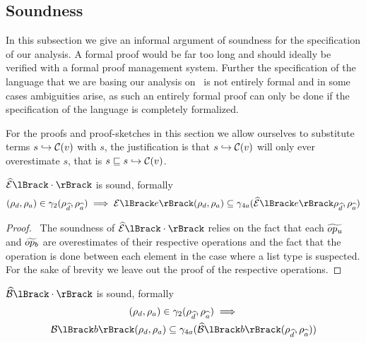 \subsection{Soundness}\label{subsec:soundness}

In this subsection we give an informal argument of soundness for the specification of our analysis.
A formal proof would be far too long and should ideally be verified with a formal proof management system.
Further the specification of the language that we are basing our analysis on~\cite{halder_abstract_2012} is not entirely formal and in some cases ambiguities arise, as such an entirely formal proof can only be done if the specification of the language is completely formalized.

For the proofs and proof-sketches in this section we allow ourselves to substitute terms $s \hookrightarrow \mathcal{C}(v)$ with $s$, the justification is that $s \hookrightarrow \mathcal{C}(v)$ will only ever overestimate $s$, that is $s \sqsubseteq s \hookrightarrow \mathcal{C}(v)$.

\begin{conjecture}\label{thm:sound-exp}
    $\absexpsem{\cdot}$ is sound, formally
    \begin{equation*}
        (\rho_d, \rho_a) \in \concrete_2(\env{\ab{d}}, \env{\ab{a}}) \implies \expsem{e}(\rho_d, \rho_a) \subseteq \concrete_{4a}(\absexpsem{e}\env{\ab{d}}, \env{\ab{a}})
    \end{equation*}
\end{conjecture}

\begin{proof}
    \pfsketch\
    The soundness of $\absexpsem{\cdot}$ relies on the fact that each $\widetilde{op_u}$ and $\widetilde{op_b}$ are overestimates of their respective operations and the fact that the operation is done between each element in the case where a list type is suspected.
    For the sake of brevity we leave out the proof of the respective operations.
\end{proof}


\begin{conjecture}\label{thm:sound-bool}
    $\absboolsem{\cdot}$ is sound, formally
    \begin{multline*}
        (\rho_d, \rho_a) \in \concrete_2(\env{\ab{d}}, \env{\ab{a}}) \implies \\
    \boolsem{b}(\rho_d, \rho_a) \subseteq \concrete_{4a}(\absboolsem{b}(\env{\ab{d}}, \env{\ab{a}}))
    \end{multline*}
\end{conjecture}


